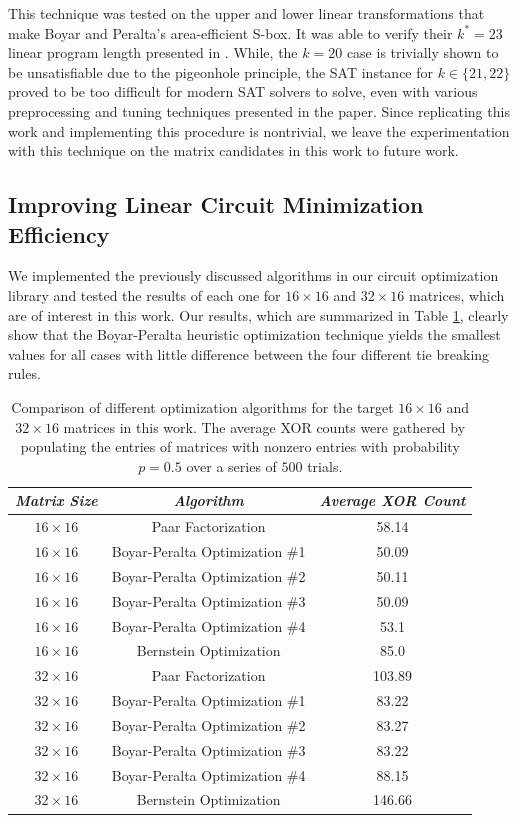 This technique was tested on the upper and lower linear transformations that make Boyar and Peralta's area-efficient S-box. It was able to verify their $k^* = 23$ linear program length presented in \cite{Boyar12-1}. While, the $k = 20$ case is trivially shown to be unsatisfiable due to the pigeonhole principle, the SAT instance for $k \in \{21, 22\}$ proved to be too difficult for modern SAT solvers to solve, even with various preprocessing and tuning techniques presented in the paper. Since replicating this work and implementing this procedure is nontrivial, we leave the experimentation with this technique on the matrix candidates in this work to future work. 

\subsection{Improving Linear Circuit Minimization Efficiency}
We implemented the previously discussed algorithms in our circuit optimization library and tested the results of each one for $16 \times 16$ and $32 \times 16$ matrices, which are of interest in this work. Our results, which are summarized in Table \ref{tab:algComparison}, clearly show that the Boyar-Peralta heuristic optimization technique yields the smallest values for all cases with little difference between the four different tie breaking rules. 
\begin{table}
\caption{Comparison of different optimization algorithms for the target $16 \times 16$ and $32 \times 16$ matrices in this work. The average XOR counts were gathered by populating the entries of matrices with nonzero entries with probability $p = 0.5$ over a series of $500$ trials.}
\label{tab:algComparison}
\begin{center}
	\begin{tabular}{| c | c | c |} \hline
		\emph{Matrix Size} & \emph{Algorithm} & \emph{Average XOR Count} \\ \hline
		$16 \times 16$ & Paar Factorization & 58.14 \\
		$16 \times 16$ & Boyar-Peralta Optimization \#1 & 50.09 \\
		$16 \times 16$ & Boyar-Peralta Optimization \#2 & 50.11 \\
		$16 \times 16$ & Boyar-Peralta Optimization \#3 & 50.09 \\
		$16 \times 16$ & Boyar-Peralta Optimization \#4 & 53.1 \\
		$16 \times 16$ & Bernstein Optimization & 85.0 \\ \hline
		$32 \times 16$ & Paar Factorization & 103.89 \\
		$32 \times 16$ & Boyar-Peralta Optimization \#1 & 83.22 \\
		$32 \times 16$ & Boyar-Peralta Optimization \#2 & 83.27 \\
		$32 \times 16$ & Boyar-Peralta Optimization \#3 & 83.22 \\
		$32 \times 16$ & Boyar-Peralta Optimization \#4 & 88.15 \\
		$32 \times 16$ & Bernstein Optimization & 146.66 \\ \hline
	\end{tabular}
\end{center}
\end{table}


